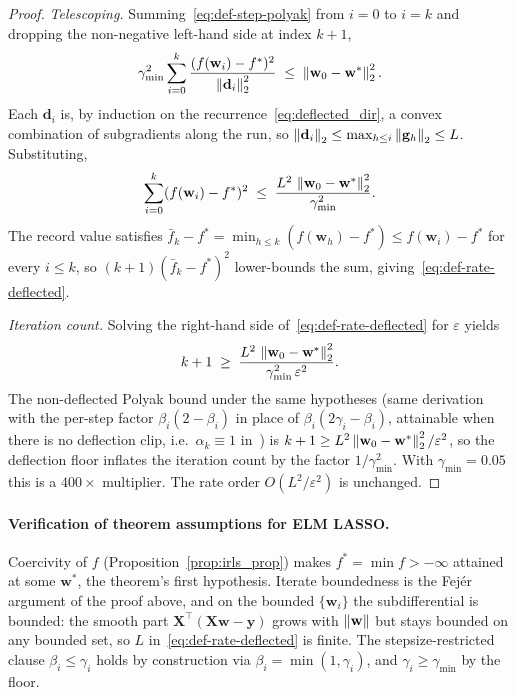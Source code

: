 \begin{proof}
\emph{Telescoping.} Summing~\eqref{eq:def-step-polyak} from $i = 0$ to $i = k$ and dropping the non-negative left-hand side at index $k+1$,
\[
\gamma_{\min}^{2} \sum_{i=0}^{k} \frac{(f(\mathbf{w}_i) - f^*)^2}{\left\lVert \mathbf{d}_i \right\rVert_2^2} \;\le\; \left\lVert \mathbf{w}_0 - \mathbf{w}^* \right\rVert_2^2.
\]
Each $\mathbf{d}_i$ is, by induction on the recurrence~\eqref{eq:deflected_dir}, a convex combination of subgradients along the run, so $\left\lVert \mathbf{d}_i \right\rVert_2 \le \max_{h \le i}\left\lVert \mathbf{g}_h \right\rVert_2 \le L$. Substituting,
\[
\sum_{i=0}^{k} (f(\mathbf{w}_i) - f^*)^2 \;\le\; \frac{L^2\,\left\lVert \mathbf{w}_0 - \mathbf{w}^* \right\rVert_2^2}{\gamma_{\min}^{2}}.
\]
The record value satisfies $\bar f_k - f^* = \min_{h \le k}(f(\mathbf{w}_h) - f^*) \le f(\mathbf{w}_i) - f^*$ for every $i \le k$, so $(k+1)(\bar f_k - f^*)^2$ lower-bounds the sum, giving~\eqref{eq:def-rate-deflected}.

\emph{Iteration count.} Solving the right-hand side of~\eqref{eq:def-rate-deflected} for $\varepsilon$ yields
\[
  k + 1 \;\ge\; \frac{L^2\,\left\lVert \mathbf{w}_0 - \mathbf{w}^* \right\rVert_2^2}{\gamma_{\min}^{2}\,\varepsilon^2}.
\]
The non-deflected Polyak bound under the same hypotheses (same derivation with the per-step factor $\beta_i(2-\beta_i)$ in place of $\beta_i(2\gamma_i - \beta_i)$, attainable when there is no deflection clip, i.e.\ $\alpha_k \equiv 1$ in~\cite{dantonio2009deflected}) is $k + 1 \ge L^2\left\lVert \mathbf{w}_0 - \mathbf{w}^* \right\rVert_2^2/\varepsilon^2$, so the deflection floor inflates the iteration count by the factor $1/\gamma_{\min}^{2}$. With $\gamma_{\min} = 0.05$ this is a $400\times$ multiplier. The rate order $O(L^2/\varepsilon^2)$ is unchanged.
\end{proof}

\paragraph{Verification of theorem assumptions for ELM LASSO.}
Coercivity of $f$ (Proposition~\ref{prop:irls_prop}) makes $f^* = \min f > -\infty$ attained at some $\mathbf{w}^*$, the theorem's first hypothesis. Iterate boundedness is the Fej\'er argument of the proof above, and on the bounded $\{\mathbf{w}_i\}$ the subdifferential is bounded: the smooth part $\mathbf{X}^\top(\mathbf{X}\mathbf{w} - \mathbf{y})$ grows with $\left\lVert \mathbf{w} \right\rVert$ but stays bounded on any bounded set, so $L$ in~\eqref{eq:def-rate-deflected} is finite. The stepsize-restricted clause $\beta_i \le \gamma_i$ holds by construction via $\beta_i = \min(1, \gamma_i)$, and $\gamma_i \ge \gamma_{\min}$ by the floor.

